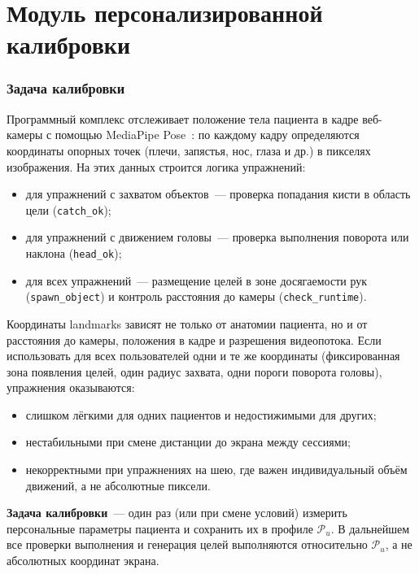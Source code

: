 \section{Модуль персонализированной калибровки}

\subsubsection{Задача калибровки}

Программный комплекс отслеживает положение тела пациента в кадре
веб-камеры с помощью MediaPipe Pose~\cite{mediapipe_pose}: по каждому
кадру определяются координаты опорных точек (плечи, запястья, нос,
глаза и др.) в пикселях изображения. На этих данных строится логика
упражнений:
\begin{itemize}
    \item для упражнений с захватом объектов~--- проверка попадания
    кисти в область цели (\texttt{catch\_ok});
    \item для упражнений с движением головы~--- проверка выполнения
    поворота или наклона (\texttt{head\_ok});
    \item для всех упражнений~--- размещение целей в зоне досягаемости
    рук (\texttt{spawn\_object}) и контроль расстояния до камеры
    (\texttt{check\_runtime}).
\end{itemize}

Координаты landmarks зависят не только от анатомии пациента, но и от
расстояния до камеры, положения в кадре и разрешения видеопотока.
Если использовать для всех пользователей одни и те же координаты
(фиксированная зона появления целей, один радиус захвата, одни пороги
поворота головы), упражнения оказываются:
\begin{itemize}
    \item слишком лёгкими для одних пациентов и недостижимыми для других;
    \item нестабильными при смене дистанции до экрана между сессиями;
    \item некорректными при упражнениях на шею, где важен
    индивидуальный объём движений, а не абсолютные пиксели.
\end{itemize}

\textbf{Задача калибровки}~--- один раз (или при смене условий) измерить
персональные параметры пациента и сохранить их в профиле
$\mathcal{P}_u$. В дальнейшем все проверки выполнения и генерация
целей выполняются относительно $\mathcal{P}_u$, а не абсолютных
координат экрана.

